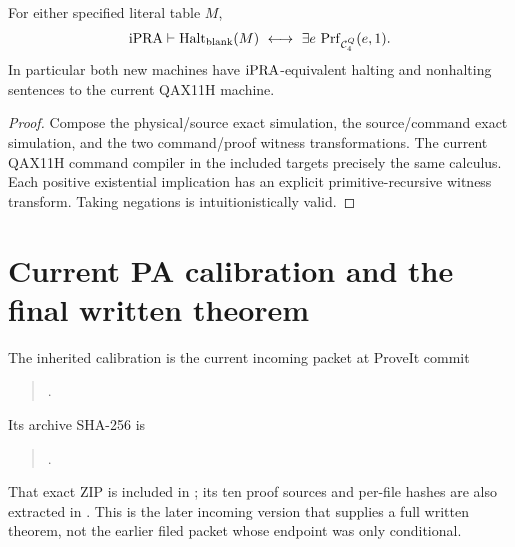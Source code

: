 \begin{theorem}
For either specified literal table $M$,
\[
 \mathrm{iPRA}\vdash
 \operatorname{Halt}_{\rm blank}(M)\ \longleftrightarrow\
       \exists e\,\operatorname{Prf}_{\mathcal C^Q_4}(e,1).
\]
In particular both new machines have $\mathrm{iPRA}$-equivalent halting
and nonhalting sentences to the current QAX11H machine.
\end{theorem}

\begin{proof}
Compose the physical/source exact simulation, the source/command
exact simulation, and the two command/proof witness transformations.
The current QAX11H command compiler in the included
 targets precisely the same calculus.
Each positive existential implication has an explicit
primitive-recursive witness transform. Taking negations is
intuitionistically valid.
\end{proof}

\section{Current PA calibration and the final written theorem}
\label{sec:calibration}

The inherited calibration is the current incoming packet
 at ProveIt
commit
\begin{quote}\small
{}.
\end{quote}
Its archive SHA-256 is
\begin{quote}\small
{}.
\end{quote}
That exact ZIP is included in ; its ten proof
sources and per-file hashes are also extracted in
. This is the later incoming
version that supplies a full written theorem, not the earlier filed
packet whose endpoint was only conditional.

